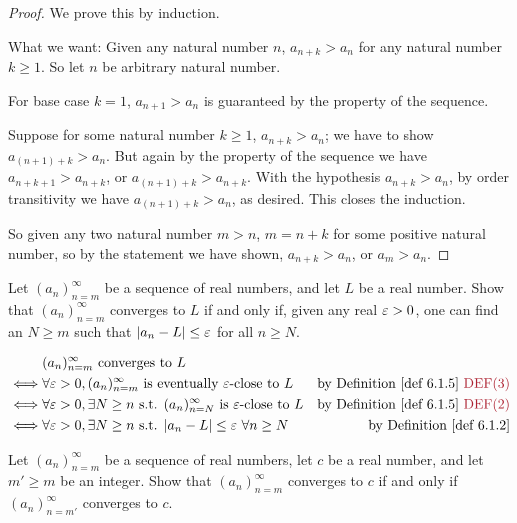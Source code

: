 \begin{proof}
We prove this by induction.

What we want: Given any natural number \(n\), \(a_{n + k} > a_n\) for any natural number \(k \ge 1\). So let \(n\) be arbitrary natural number.

For base case \(k = 1\), \(a_{n + 1} > a_n\) is guaranteed by the property of the sequence.

Suppose for some natural number \(k \ge 1\), \(a_{n + k} > a_n\);
we have to show \(a_{(n + 1) + k} > a_n\).
But again by the property of the sequence we have \(a_{n + k + 1} > a_{n + k}\), or \(a_{(n + 1) + k} > a_{n + k}\).
With the hypothesis \(a_{n + k} > a_n\), by order transitivity  we have \(a_{(n + 1) + k} > a_n\), as desired.
This closes the induction.

So given any two natural number \(m > n\), \(m = n + k\) for some positive natural number, so by the statement we have shown, \(a_{n + k} > a_n\), or \(a_m > a_n\).
\end{proof}

\begin{exercise} \label{exercise 6.1.2}
Let \((a_n)_{n = m}^{\infty}\) be a sequence of real numbers, and let \(L\) be a real number.
Show that \((a_n)_{n = m}^{\infty}\) converges to \(L\) if and only if,
given any real \(\varepsilon > 0\), one can find an \(N \ge m\) such that \(\lvert a_n - L\rvert \le \varepsilon\) for all \(n \ge N\).
\end{exercise}

\begin{align*}
         & (a_n)_{n = m}^{\infty} \text{ converges to } L \\
    \iff & \forall \varE > 0, (a_n)_{n = m}^{\infty} \text{ is eventually } \varE\text{-close to } L & \text{by \DEF{6.1.5} \MAROON{DEF(3)}} \\
    \iff & \forall \varE > 0, \exists N \ge n \text{ s.t. } (a_n)_{n = N}^{\infty} \text{ is } \varE\text{-close to } L & \text{by \DEF{6.1.5} \MAROON{DEF(2)}} \\
    \iff & \forall \varE > 0, \exists N \ge n \text{ s.t. } \abs{a_n - L} \le \varE\ \forall n \ge N & \text{by \DEF{6.1.2}}
\end{align*}

\begin{exercise} \label{exercise 6.1.3}
Let \((a_n)_{n = m}^{\infty}\) be a sequence of real numbers, let \(c\) be a real number, and let \(m' \ge m\) be an integer.
Show that \((a_n)_{n = m}^{\infty}\) converges to \(c\) if and only if \((a_n)_{n = m'}^{\infty}\) converges to \(c\).
\end{exercise}

